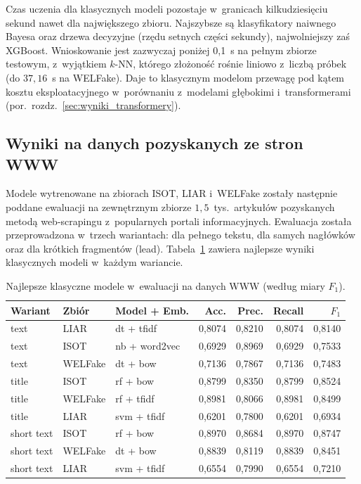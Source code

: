 Czas uczenia dla klasycznych modeli pozostaje w~granicach kilkudziesięciu
sekund nawet dla największego zbioru. Najszybsze są klasyfikatory
naiwnego Bayesa oraz drzewa decyzyjne (rzędu setnych części sekundy),
najwolniejszy zaś XGBoost. Wnioskowanie jest zazwyczaj poniżej 0,1~s
na pełnym zbiorze testowym, z~wyjątkiem $k$-NN, którego złożoność rośnie
liniowo z~liczbą próbek (do \(37{,}16\)~s na WELFake). Daje to klasycznym
modelom przewagę pod kątem kosztu eksploatacyjnego w~porównaniu
z~modelami głębokimi i~transformerami (por.\ rozdz.~\ref{sec:wyniki_transformery}).

\subsection{Wyniki na danych pozyskanych ze stron WWW}
\label{sec:wyniki_klasyczne_web}

Modele wytrenowane na zbiorach ISOT, LIAR i~WELFake zostały następnie
poddane ewaluacji na zewnętrznym zbiorze \(1{,}5\)~tys.\ artykułów
pozyskanych metodą web-scrapingu z~popularnych portali informacyjnych.
Ewaluacja została przeprowadzona w~trzech wariantach: dla pełnego
tekstu, dla samych nagłówków oraz dla krótkich fragmentów (lead).
Tabela~\ref{tab:klas_web} zawiera najlepsze wyniki klasycznych modeli
w~każdym wariancie.

\begin{table}[ht]
\centering
\caption{Najlepsze klasyczne modele w~ewaluacji na danych WWW
(według miary $F_1$).}
\label{tab:klas_web}
\begin{tabular}{lllrrrr}
\toprule
Wariant & Zbiór & Model + Emb. & Acc. & Prec. & Recall & $F_1$ \\
\midrule
text       & LIAR    & dt + tfidf      & 0,8074 & 0,8210 & 0,8074 & 0,8140 \\
text       & ISOT    & nb + word2vec   & 0,6929 & 0,8969 & 0,6929 & 0,7533 \\
text       & WELFake & dt + bow        & 0,7136 & 0,7867 & 0,7136 & 0,7483 \\
title      & ISOT    & rf + bow        & 0,8799 & 0,8350 & 0,8799 & 0,8524 \\
title      & WELFake & rf + tfidf      & 0,8981 & 0,8066 & 0,8981 & 0,8499 \\
title      & LIAR    & svm + tfidf     & 0,6201 & 0,7800 & 0,6201 & 0,6934 \\
short text & ISOT    & rf + bow        & 0,8970 & 0,8684 & 0,8970 & 0,8747 \\
short text & WELFake & dt + bow        & 0,8839 & 0,8119 & 0,8839 & 0,8451 \\
short text & LIAR    & svm + tfidf     & 0,6554 & 0,7990 & 0,6554 & 0,7210 \\
\bottomrule
\end{tabular}
\end{table}

